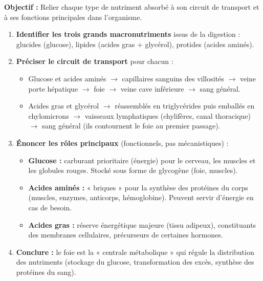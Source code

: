 \documentclass[11pt]{article}
\newcommand{\cle}[1]{{\popxbold\color{popdark}#1}}
\begin{document}
\begin{methode}
    \textbf{Objectif :} Relier chaque type de nutriment absorbé à son circuit de transport et à ses fonctions principales dans l'organisme.
    \begin{enumerate}
        \item \textbf{Identifier les trois grands macronutriments} issus de la digestion : \cle{glucides} (glucose), \cle{lipides} (acides gras + glycérol), \cle{protides} (acides aminés).
        \item \textbf{Préciser le circuit de transport} pour chacun :
            \begin{itemize}
                \item Glucose et acides aminés $\rightarrow$ capillaires sanguins des villosités $\rightarrow$ \cle{veine porte hépatique} $\rightarrow$ \cle{foie} $\rightarrow$ veine cave inférieure $\rightarrow$ sang général.
                \item Acides gras et glycérol $\rightarrow$ réassemblés en triglycérides puis emballés en \cle{chylomicrons} $\rightarrow$ vaisseaux \cle{lymphatiques} (chylifères, canal thoracique) $\rightarrow$ sang général (ils contournent le foie au premier passage).
            \end{itemize}
        \item \textbf{Énoncer les rôles principaux} (fonctionnels, pas mécanistiques) :
            \begin{itemize}
                \item \textbf{Glucose :} carburant prioritaire (énergie) pour le cerveau, les muscles et les globules rouges. Stocké sous forme de \cle{glycogène} (foie, muscles).
                \item \textbf{Acides aminés :} « briques » pour la synthèse des protéines du corps (muscles, enzymes, anticorps, hémoglobine). Peuvent servir d'énergie en cas de besoin.
                \item \textbf{Acides gras :} réserve énergétique majeure (tissu adipeux), constituants des \cle{membranes cellulaires}, précurseurs de certaines hormones.
            \end{itemize}
        \item \textbf{Conclure :} le foie est la « centrale métabolique » qui régule la distribution des nutriments (stockage du glucose, transformation des excès, synthèse des protéines du sang).
    \end{enumerate}
\end{methode}
\end{document}
